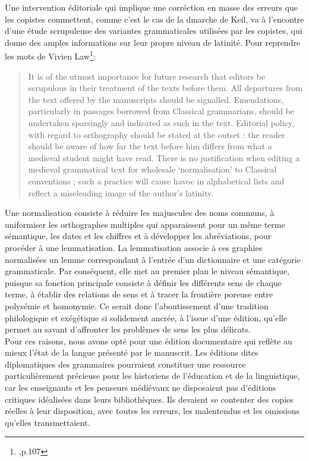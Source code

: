 \documentclass[a4paper, twoside, 12pt]{book}
\begin{document}
Une intervention éditoriale qui implique une corréction en masse des \og{} erreurs \fg{} que les copistes commettent, comme c'est le cas de la dmarche de Keil, va à l'encontre d'une étude scrupuleuse des variantes grammaticales utilisées par les copistes, qui donne des amples informations sur leur propre niveau de latinité. Pour reprendre les mots de Vivien Law\footnote{\cite{law1982insular},p.107}: 

\blockquote{It is of the utmost importance for future research that editors be scrupulous in their treatment of the texts before them. All departures from the text offered by the manuscripts should be signalled. Emendations, particularly in passages borrowed from Classical grammarians, should be undertaken sparsingly and indicated as such in the text. Editorial policy, with regard to orthography should be stated at the outset : the reader should be aware of how far the text before him differs from what a medieval student might have read. There is no justification when editing a medieval grammatical text for wholesale ‘normalisation’ to Classical conventions ; such a practice will cause havoc in alphabetical lists and reflect a miseleading image of the author’s latinity.} 

Une normalisation consiste à réduire les majuscules des noms communs, à uniformiser les orthographes multiples qui apparaissent pour un même terme sémantique, les dates et les chiffres et à développer les abréviations, pour procéder à une lemmatisation. La lemmatisation associe à ces graphies normalisées un lemme correspondant à l'entrée d'un dictionnaire et une catégorie grammaticale. Par conséquent, elle met au premier plan le niveau sémantique, puisque sa fonction principale consiste à définir les différents sens de chaque terme, à établir des relations de sens et à tracer la frontière poreuse entre polysémie et homonymie. Ce serait donc l'aboutissement d'une tradition philologique et exégétique si solidement ancrée, à l'issue d'une édition, qu'elle permet au savant d'affronter les problèmes de sens les plus délicats.\\

Pour ces raisons, nous avons opté pour une édition documentaire qui reflète au mieux l'état de la langue présenté par le manuscrit. Les éditions dites diplomatiques des grammaires pourraient constituer une ressource particulièrement précieuse pour les historiens de l'éducation et de la linguistique, car les enseignants et les penseurs médiévaux ne disposaient pas d'éditions critiques idéalisées dans leurs bibliothèques. Ils devaient se contenter des copies réelles à leur disposition, avec toutes les erreurs, les malentendus et les omissions qu'elles transmettaient. \\
\end{document}
